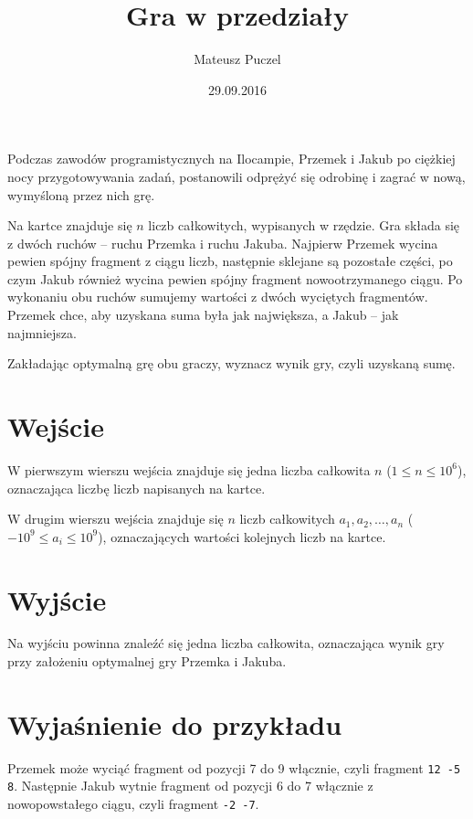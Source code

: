 \documentclass[zad,zawodnik,utf8]{sinol}
\title{Gra w przedziały}
\author{Mateusz Puczel} %
\date{29.09.2016}
\begin{document}
\begin{tasktext}%
Podczas zawodów programistycznych na Ilocampie, Przemek i Jakub po ciężkiej nocy przygotowywania zadań, postanowili odprężyć się odrobinę
i zagrać w nową, wymyśloną przez nich grę.

Na kartce znajduje się $n$ liczb całkowitych, wypisanych w rzędzie. Gra składa się z dwóch ruchów -- ruchu Przemka i ruchu Jakuba.
Najpierw Przemek wycina pewien spójny fragment z ciągu liczb, następnie sklejane są pozostałe części, po czym Jakub również wycina pewien
spójny fragment nowootrzymanego ciągu. Po wykonaniu obu ruchów sumujemy wartości z dwóch wyciętych fragmentów. Przemek chce, aby uzyskana suma była
jak największa, a Jakub -- jak najmniejsza.

Zakładając optymalną grę obu graczy, wyznacz wynik gry, czyli uzyskaną sumę.
  \section{Wejście}
W pierwszym wierszu wejścia znajduje się jedna liczba całkowita $n$ ($1 \leq n \leq 10^6$), oznaczająca liczbę liczb napisanych na kartce.

W drugim wierszu wejścia znajduje się $n$ liczb całkowitych $a_1, a_2, \dots, a_n$ ($-10^9 \leq a_i \leq 10^9$), oznaczających wartości
kolejnych liczb na kartce.
  \section{Wyjście}
Na wyjściu powinna znaleźć się jedna liczba całkowita, oznaczająca wynik gry przy założeniu optymalnej gry Przemka i Jakuba.
\makecompactexample

  \section{Wyjaśnienie do przykładu}
Przemek może wyciąć fragment od pozycji 7 do 9 włącznie, czyli fragment \texttt{12 -5 8}.
Następnie Jakub wytnie fragment od pozycji 6 do 7 włącznie z nowopowstałego ciągu, czyli fragment \texttt{-2 -7}.

\end{tasktext}
\end{document}
